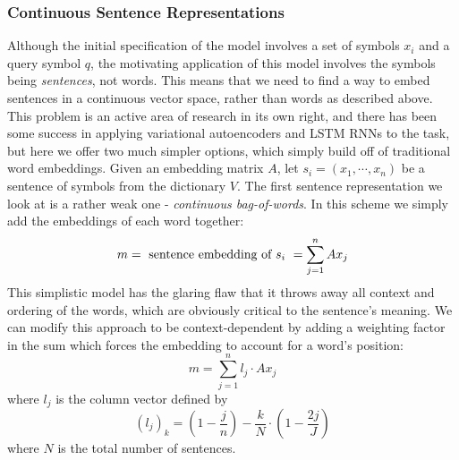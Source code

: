 \documentclass{article}
\begin{document}
\subsubsection{Continuous Sentence Representations}
Although the initial specification of the model involves a set of symbols $ x_i $ and a query symbol $ q $, the motivating application of this model involves the symbols being \textit{sentences}, not words. This means that we need to find a way to embed sentences in a continuous vector space, rather than words as described above. This problem is an active area of research in its own right, and there has been some success in applying variational autoencoders and LSTM RNNs to the task, but here we offer two much simpler options, which simply build off of traditional word embeddings.
\newline \newline
Given an embedding matrix $ A $, let $ s_i = (x_1, \cdots, x_n) $ be a sentence of symbols from the dictionary $ V $. The first sentence representation we look at is a rather weak one - \textit{continuous bag-of-words}. In this scheme we simply add the embeddings of each word together:
$$ m = \text{ sentence embedding of $ s_i $ } = \sum_{j = 1}^n A x_j $$
This simplistic model has the glaring flaw that it throws away all context and ordering of the words, which are obviously critical to the sentence's meaning. We can modify this approach to be context-dependent by adding a weighting factor in the sum which forces the embedding to account for a word's position:
$$ m = \sum_{j = 1}^n l_j \cdot A x_j $$
where $ l_j $ is the column vector defined by
$$ (l_j)_k = \left( 1 - \frac{j}{n} \right) - \frac{k}{N} \cdot \left( 1 - \frac{2 j}{J} \right) $$
where $ N $ is the total number of sentences.
\end{document}
